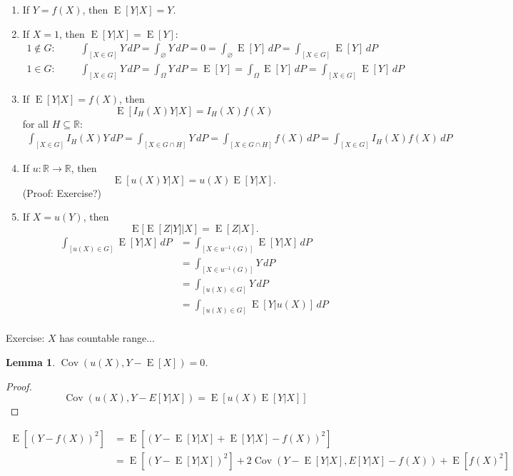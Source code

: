 \documentclass[12pt]{amsart}
\newcommand{\RR}{\mathbb{R}}
\DeclareMathOperator{\EE}{E}
\DeclareMathOperator{\Cov}{Cov}
\newtheorem{lemma}[theorem]{Lemma}
\begin{document}
\begin{enumerate}
    \setlength{\itemsep}{1em}
    \item If $Y=f(X)$, then $\EE[Y|X]=Y$.
    \item If $X=1$, then $\EE[Y|X]=\EE[Y]$:
\begin{align*}
    1\notin G:& & &\int_{[X\in G]} Y\,dP = \int_{\varnothing}Y\,dP = 0 = \int_{\varnothing}\EE[Y]\,dP = \int_{[X\in G]} \EE[Y]\,dP\\[0.5em]
    1\in G:& & &\int_{[X\in G]} Y\,dP = \int_\Omega Y\,dP = \EE[Y] = \int_\Omega \EE[Y]\,dP = \int_{[X\in G]} \EE[Y]\,dP
\end{align*}
\item If $\EE[Y|X]=f(X)$, then $$\EE[I_H(X)Y|X]=I_H(X)f(X)$$ for all $H\subseteq\RR$:
\begin{align*}
\int_{[X\in G]} I_H(X)Y\,dP =     \int_{[X\in G\cap H]} Y\,dP = \int_{[X\in G\cap H]} f(X)\,dP = \int_{[X\in G]} I_H(X)f(X)\,dP
\end{align*}
\item If $u:\RR\to\RR$, then $$\EE[u(X)Y|X]=u(X)\EE[Y|X].$$
(Proof: Exercise?)
\item If $X=u(Y)$, then $$\EE[\EE[Z|Y]|X]=\EE[Z|X].$$
\begin{align*}
    \int_{[u(X)\in G]} \EE[Y|X]\,dP &=
    \int_{[X\in u^{-1}(G)]} \EE[Y|X]\,dP\\
    &= \int_{[X\in u^{-1}(G)]} Y\,dP\\
    &= \int_{[u(X)\in G]} Y\,dP\\
    &= \int_{[u(X)\in G]} \EE[Y|u(X)]\,dP\\
\end{align*}
\end{enumerate}
Exercise: $X$ has countable range...

\begin{lemma}
    $\Cov(u(X), Y-\EE[X])=0$.
\end{lemma}
\begin{proof}
    \[\Cov(u(X), Y-E[Y|X]) = \EE[u(X)\EE[Y|X]]\]
\end{proof}

\begin{align*}
    \EE[(Y - f(X))^2] &= \EE[(Y - \EE[Y|X] + \EE[Y|X] - f(X))^2]\\
    &= \EE[(Y - \EE[Y|X])^2] + 2\Cov(Y-\EE[Y|X], E[Y|X] - f(X)) + \EE[f(X)^2]
\end{align*}
\end{document}
